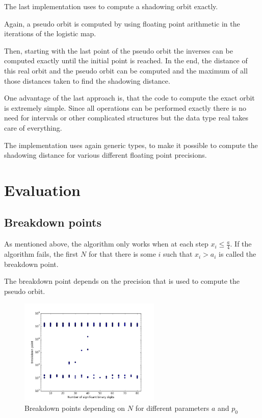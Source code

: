   The last implementation uses \irram to compute a shadowing orbit exactly.

  Again, a pseudo orbit is computed by using floating point arithmetic in the
  iterations of the logistic map.

  Then, starting with the last point of the pseudo orbit the inverses can be computed exactly until the initial point is reached.
  In the end, the distance of this real orbit and the pseudo orbit can be computed and the maximum of all those distances taken to find the shadowing distance.

  One advantage of the last approach is, that the \irram code to compute the exact orbit is extremely simple. 
  Since all operations can be performed exactly there is no need for intervals
  or other complicated structures but the data type real takes care of
  everything.

  The implementation uses again generic types, to make it possible to compute
  the shadowing distance for various different floating point precisions.
\section{Evaluation}
  \subsection{Breakdown points}
  As mentioned above, the algorithm only works when at each step $x_i \leq
  \frac{a}{4}$.  
  If the algorithm fails, the first $N$ for that there is some $i$ such that
  $x_i > a_i$ is called the breakdown point.

  The breakdown point depends on the precision that is used to compute the pseudo orbit. 
  \begin{figure}[h]
    \centering
    \includegraphics[width=0.6\textwidth]{img/dynamic_systems/breakdown}
    \caption{Breakdown points depending on $N$ for different parameters $a$ and
    $p_0$}\label{fig:breakdown}
  \end{figure}

